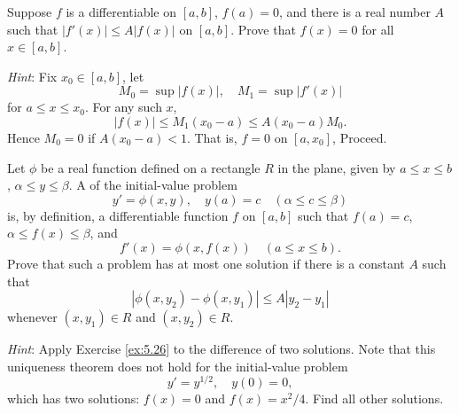 \begin{myExercise}
    \label{ex:5.26}
    Suppose $f$ is a differentiable on $[a, b]$, $f(a) = 0$, 
    and there is a real number $A$ such that 
    $|f'(x)| \leq A |f(x)|$ on $[a, b]$. 
    Prove that $f(x) = 0$ for all $x \in [a, b]$. 
    
    \emph{Hint}: Fix $x_0 \in [a, b]$, let
    \begin{equation*}
        M_0 = \sup |f(x)|, \quad 
        M_1 = \sup |f'(x)|
    \end{equation*}
    for $a \leq x \leq x_0$. 
    For any such $x$,
    \begin{equation*}
        \left| f(x) \right| \leq M_1(x_0-a) \leq A(x_0-a)M_0 .
    \end{equation*}
    Hence $M_0 = 0$ if $A(x_0 - a) < 1$. 
    That is, $f= 0$ on $[a, x_0]$, Proceed.
\end{myExercise}


\begin{myExercise}
    \label{ex:5.27}
    Let $\phi$ be a real function defined on a rectangle $R$ in the plane, 
    given by $a \leq x \leq b$, $\alpha \leq y \leq \beta$.
    A  of the initial-value problem 
    \begin{equation*}
        y' = \phi(x,y), \quad 
        y(a) = c \quad 
        (\alpha \leq c \leq \beta)
    \end{equation*}
    is, by definition, a differentiable function $f$ on $[a,b]$ 
    such that $f(a)=c$, $\alpha \leq f(x) \leq \beta$,
    and 
    \begin{equation*}
        f'(x) = \phi(x, f(x))
        \quad 
        (a \leq x \leq b).
    \end{equation*}
    Prove that such a problem has at most one solution if there is a constant $A$ such that 
    \begin{equation*}
        \left| \phi(x,y_2)-\phi(x,y_1) \right| \leq A \left| y_2 - y_1 \right| 
    \end{equation*}
    whenever $(x,y_1) \in R$ and $(x,y_2) \in R$.

    \emph{Hint}: Apply Exercise \ref{ex:5.26} to the difference of two solutions. 
    Note that this uniqueness theorem does not hold for the initial-value problem
    \begin{equation*}
        y' = y^{1/2}, \quad 
        y(0) = 0,
    \end{equation*}
    which has two solutions: $f(x) = 0$ and $f(x) = x^2/4$. 
    Find all other solutions.
\end{myExercise}


